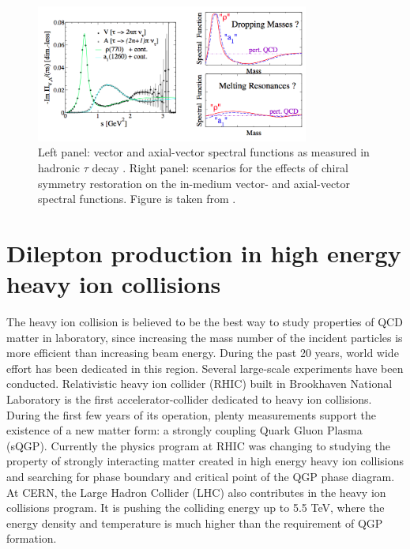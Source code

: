 \begin{figure}
\begin{centering}
\includegraphics[width=0.8\textwidth]{fig/1.Introduction/Vector_Mason_chiral}
\par\end{centering}

\protect\caption{Left panel: vector and axial-vector spectral functions as measured
in hadronic $\tau$ decay \cite{Barate-et-al.:1998fk}. Right panel:
scenarios for the effects of chiral symmetry restoration on the in-medium
vector- and axial-vector spectral functions. Figure is taken from
\cite{R.-Rapp:hl}.}


\label{fig:Meson_Medium}
\end{figure}



\section{Dilepton production in high energy heavy ion collisions}

The heavy ion collision is believed to be the best way to study properties
of QCD matter in laboratory, since increasing the mass number of the
incident particles is more efficient than increasing beam energy.
During the past 20 years, world wide effort has been dedicated in
this region. Several large-scale experiments have been conducted.
Relativistic heavy ion collider (RHIC) built in Brookhaven National
Laboratory is the first accelerator-collider dedicated to heavy ion
collisions. During the first few years of its operation, plenty measurements
support the existence of a new matter form: a strongly coupling Quark
Gluon Plasma (sQGP). Currently the physics program at RHIC was changing
to studying the property of strongly interacting matter created in
high energy heavy ion collisions and searching for phase boundary
and critical point of the QGP phase diagram. At CERN, the Large Hadron
Collider (LHC) also contributes in the heavy ion collisions program.
It is pushing the colliding energy up to 5.5 TeV, where the energy
density and temperature is much higher than the requirement of QGP
formation.

